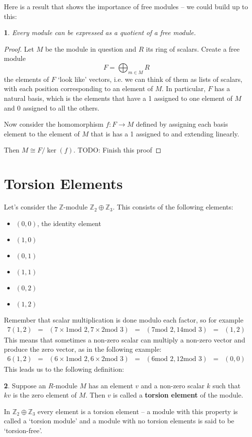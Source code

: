 \documentclass[oneside,english]{amsbook}
\numberwithin{section}{chapter}
\theoremstyle{plain}
\newtheorem{thm}{\protect\theoremname}
\theoremstyle{definition}
\newtheorem{defn}[thm]{\protect\definitionname}
\providecommand{\definitionname}{Definition}
\providecommand{\theoremname}{Theorem}
\begin{document}
			Here is a result that shows the importance of free modules -- we could build up to this:
			
			\begin{thm}
				Every module can be expressed as a quotient of a free module.
			\end{thm}
			
			\begin{proof}
				Let $M$ be the module in question and $R$ its ring of scalars. Create a free module
				\[
					F = \bigoplus_{m\in M} R
				\]
				the elements of $F$ `look like' vectors, i.e. we can think of them as lists of scalars, with each position corresponding to an element of $M$. In particular, $F$ has a natural basis, which is the elements that have a 1 assigned to one element of $M$ and 0 assigned to all the others.
				
				Now consider the homomorphism $f:F\to M$ defined by assigning each basis element to the element of $M$ that is has a 1 assigned to and extending linearly.
				
				Then $M\cong F/\ker(f)$. TODO: Finish this proof  
			\end{proof}

		\section{Torsion Elements}
			
			Let's consider the $\mathbb{Z}$-module $\mathbb{Z}_2\oplus\mathbb{Z}_3$. This consists of the following elements:
			\begin{itemize}
				\item $(0, 0)$, the identity element
				\item$(1, 0)$
				\item$(0, 1)$
				\item$(1, 1)$
				\item$(0, 2)$
				\item$(1, 2)$
			\end{itemize}
			Remember that scalar multiplication is done modulo each factor, so for example
			\begin{align}[rcl]
				7(1, 2) &=& (7\times 1 \text{mod 2}, 7\times 2 \text{mod 3})
				 &=& (7 \text{mod 2}, 14 \text{mod 3})
				 &=& (1, 2)
			\end{align}
			This means that sometimes a non-zero scalar can multiply a non-zero vector and produce the zero vector, as in the following example:
			\begin{align}[rcl]
				6(1, 2) &=& (6\times 1 \text{mod 2}, 6\times 2 \text{mod 3})
				 &=& (6 \text{mod 2}, 12 \text{mod 3})
				&=& (0, 0)
			\end{align}
			This leads us to the following definition:
			\begin{defn}
				Suppose an $R$-module $M$ has an element $v$ and a non-zero scalar $k$ such that $kv$ is the zero element of $M$. Then $v$ is called a \textbf{torsion element} of the module.
			\end{defn}
			In $\mathbb{Z}_2\oplus\mathbb{Z}_3$ every element is a torsion element -- a module with this property is called a `torsion module' and a module with no torsion elements is said to be `torsion-free'.
\end{document}
